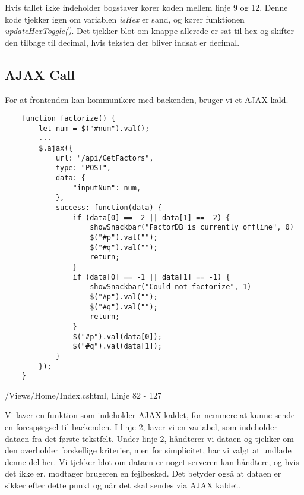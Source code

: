 \documentclass[a4paper,12pt]{extarticle}
\begin{document}
    \medskip

    Hvis tallet ikke indeholder bogstaver kører koden mellem linje 9 og 12.
    Denne kode tjekker igen om variablen \emph{isHex} er sand, og kører funktionen \emph{updateHexToggle()}.
    Det tjekker blot om knappe allerede er sat til hex og skifter den tilbage til decimal, hvis teksten der bliver indsat er decimal.

    \subsection{AJAX Call}
    For at frontenden kan kommunikere med backenden, bruger vi et AJAX kald.


    \begin{listing}[!ht]
        \begin{verbatim}
    function factorize() {
        let num = $("#num").val();
        ...
        $.ajax({
            url: "/api/GetFactors",
            type: "POST",
            data: {
                "inputNum": num,
            },
            success: function(data) {
                if (data[0] == -2 || data[1] == -2) { 
                    showSnackbar("FactorDB is currently offline", 0) 
                    $("#p").val("");
                    $("#q").val("");
                    return;
                }
                if (data[0] == -1 || data[1] == -1) { 
                    showSnackbar("Could not factorize", 1) 
                    $("#p").val("");
                    $("#q").val("");
                    return;
                }
                $("#p").val(data[0]);
                $("#q").val(data[1]);
            }
        });
    }
        \end{verbatim}
        \caption{/Views/Home/Index.cshtml, Linje 82 - 127}
    \end{listing}

    Vi laver en funktion som indeholder AJAX kaldet, for nemmere at kunne sende en forespørgsel til backenden.
    I linje 2, laver vi en variabel, som indeholder dataen fra det første tekstfelt.
    Under linje 2, håndterer vi dataen og tjekker om den overholder forskellige kriterier, men for simplicitet, har vi valgt at undlade denne del her.
    Vi tjekker blot om dataen er noget serveren kan håndtere, og hvis det ikke er, modtager brugeren en fejlbesked.
    Det betyder også at dataen er sikker efter dette punkt og når det skal sendes via AJAX kaldet.
\end{document}
